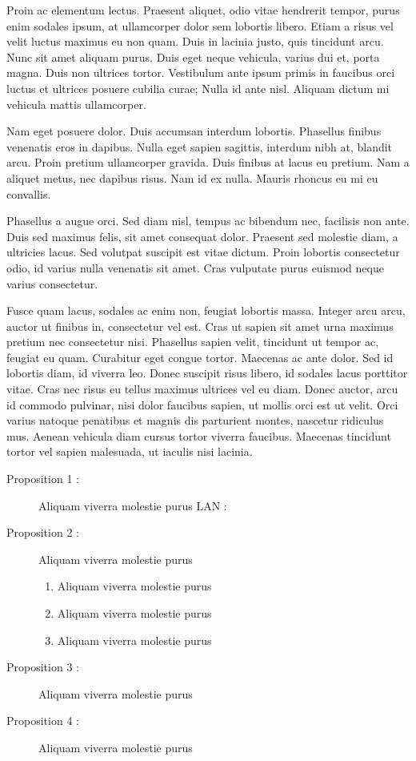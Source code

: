 \documentclass[a4paper,12pt]{report}
\begin{document}
Proin ac elementum lectus. Praesent aliquet, odio vitae hendrerit tempor, purus enim sodales ipsum, at ullamcorper dolor sem lobortis libero. Etiam a risus vel velit luctus maximus eu non quam. Duis in lacinia justo, quis tincidunt arcu. Nunc sit amet aliquam purus. Duis eget neque vehicula, varius dui et, porta magna. Duis non ultrices tortor. Vestibulum ante ipsum primis in faucibus orci luctus et ultrices posuere cubilia curae; Nulla id ante nisl. Aliquam dictum mi vehicula mattis ullamcorper.

Nam eget posuere dolor. Duis accumsan interdum lobortis. Phasellus finibus venenatis eros in dapibus. Nulla eget sapien sagittis, interdum nibh at, blandit arcu. Proin pretium ullamcorper gravida. Duis finibus at lacus eu pretium. Nam a aliquet metus, nec dapibus risus. Nam id ex nulla. Mauris rhoncus eu mi eu convallis.

Phasellus a augue orci. Sed diam nisl, tempus ac bibendum nec, facilisis non ante. Duis sed maximus felis, sit amet consequat dolor. Praesent sed molestie diam, a ultricies lacus. Sed volutpat suscipit est vitae dictum. Proin lobortis consectetur odio, id varius nulla venenatis sit amet. Cras vulputate purus euismod neque varius consectetur.

Fusce quam lacus, sodales ac enim non, feugiat lobortis massa. Integer arcu arcu, auctor ut finibus in, consectetur vel est. Cras ut sapien sit amet urna maximus pretium nec consectetur nisi. Phasellus sapien velit, tincidunt ut tempor ac, feugiat eu quam. Curabitur eget congue tortor. Maecenas ac ante dolor. Sed id lobortis diam, id viverra leo. Donec suscipit risus libero, id sodales lacus porttitor vitae. Cras nec risus eu tellus maximus ultrices vel eu diam. Donec auctor, arcu id commodo pulvinar, nisi dolor faucibus sapien, ut mollis orci est ut velit. Orci varius natoque penatibus et magnis dis parturient montes, nascetur ridiculus mus. Aenean vehicula diam cursus tortor viverra faucibus. Maecenas tincidunt tortor vel sapien malesuada, ut iaculis nisi lacinia.

\begin{description}
	\item[Proposition 1 :] Aliquam viverra molestie purus\ac{ LAN} :
	\item[Proposition 2 :] Aliquam viverra molestie purus
			\begin{enumerate}[label=\textit{\roman*}]
						  \item Aliquam viverra molestie purus
						  \item Aliquam viverra molestie purus
						  \item Aliquam viverra molestie purus
			\end{enumerate}
	\item[Proposition 3 :] Aliquam viverra molestie purus
	\item[Proposition 4 :]  Aliquam viverra molestie purus
\end{description}
\end{document}

